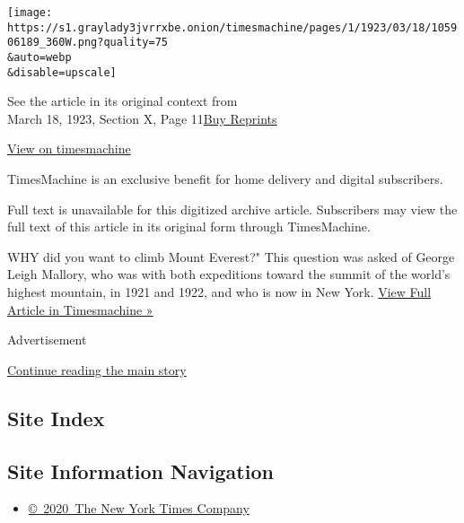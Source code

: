 \texttt{[image: https://s1.graylady3jvrrxbe.onion/timesmachine/pages/1/1923/03/18/105906189\_360W.png?quality=75\\\&auto=webp\\\&disable=upscale]}

See the article in its original context from\\
March 18, 1923, Section X, Page
11\href{https://store.nytimes3xbfgragh.onion/collections/new-york-times-page-reprints?utm_source=nytimes\&utm_medium=article-page\&utm_campaign=reprints}{Buy
Reprints}

\href{http://timesmachine.nytimes3xbfgragh.onion/timesmachine/1923/03/18/105906189.html}{View
on timesmachine}

TimesMachine is an exclusive benefit for home delivery and digital
subscribers.

Full text is unavailable for this digitized archive article. Subscribers
may view the full text of this article in its original form through
TimesMachine.

WHY did you want to climb Mount Everest?" This question was asked of
George Leigh Mallory, who was with both expeditions toward the summit of
the world's highest mountain, in 1921 and 1922, and who is now in New
York.
\href{http://timesmachine.nytimes3xbfgragh.onion/timesmachine/1923/03/18/105906189.html}{View
Full Article in Timesmachine »}

Advertisement

\protect\hyperlink{after-bottom}{Continue reading the main story}

\hypertarget{site-index}{%
\subsection{Site Index}\label{site-index}}

\hypertarget{site-information-navigation}{%
\subsection{Site Information
Navigation}\label{site-information-navigation}}

\begin{itemize}
\tightlist
\item
  \href{https://help.nytimes3xbfgragh.onion/hc/en-us/articles/115014792127-Copyright-notice}{©~2020~The
  New York Times Company}
\end{itemize}

